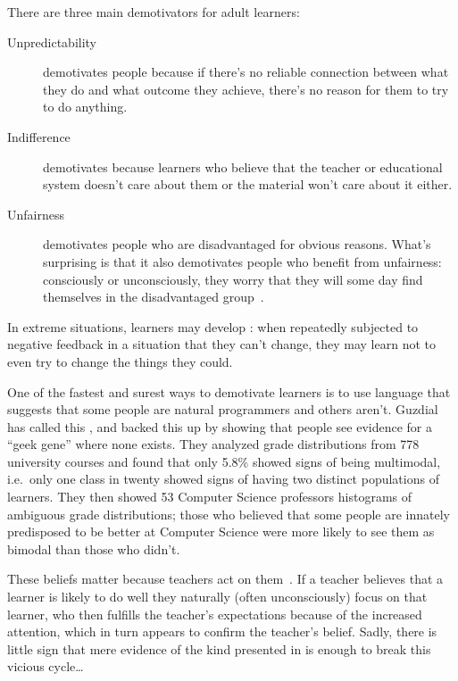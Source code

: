 There are three main demotivators for adult learners:

\begin{description}

\item[Unpredictability]
  demotivates people because
  if there's no reliable connection between what they do and what outcome they achieve,
  there's no reason for them to try to do anything.

\item[Indifference]
  demotivates because
  learners who believe that the teacher or educational system doesn't care about them
  or the material won't care about it either.

\item[Unfairness]
  demotivates people who are disadvantaged for obvious reasons.
  What's surprising is that it also demotivates people who benefit from unfairness:
  consciously or unconsciously,
  they worry that
  they will some day find themselves in the disadvantaged group~\cite{Wilk2011}.

\end{description}

In extreme situations,
learners may develop :
when repeatedly subjected to negative feedback in a situation that they can't change,
they may learn not to even try to change the things they could.

One of the fastest and surest ways to demotivate learners is
to use language that suggests that some people are natural programmers and others aren't.
Guzdial has called this
,
and \cite{Pati2016} backed this up by showing that
people see evidence for a ``geek gene'' where none exists.
They analyzed grade distributions from 778 university courses and found that only 5.8\% showed signs
of being multimodal,
i.e.\ only one class in twenty showed signs of having two distinct populations of learners.
They then showed 53 Computer Science professors histograms of ambiguous grade distributions;
those who believed that some people are innately predisposed to be better at Computer Science
were more likely to see them as bimodal than those who didn't.

These beliefs matter because teachers act on them~\cite{Brop1983}.
If a teacher believes that a learner is likely to do well
they naturally (often unconsciously) focus on that learner,
who then fulfills the teacher's expectations because of the increased attention,
which in turn appears to confirm the teacher's belief.
Sadly,
there is little sign that mere evidence of the kind presented in \cite{Pati2016}
is enough to break this vicious cycle{\ldots}

